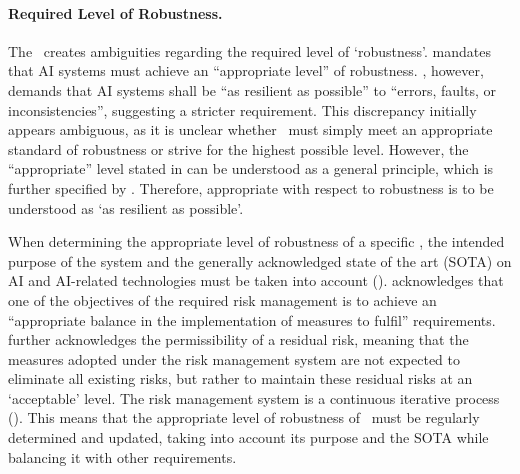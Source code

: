 \paragraph{Required Level of 
Robustness.} 
% 
The \EUAIAct\ creates ambiguities regarding the required level of `robustness'.
%
 mandates that AI systems must achieve an ``appropriate level'' of robustness.
, however, demands that AI systems shall be ``as resilient as possible'' to ``errors, faults, or inconsistencies'', suggesting a stricter requirement. 
% 
This discrepancy initially appears ambiguous, as it is unclear whether \HRAIS\ must simply meet an appropriate standard of robustness or strive for the highest possible level. 
% 
However, the ``appropriate'' level stated in  can be understood as a general principle, which is further specified by . Therefore, appropriate with respect to robustness is to be understood as `as resilient as possible'. 


When determining the appropriate level of robustness of a specific \HRAIS, the intended purpose of the system and the generally acknowledged state of the art (SOTA) on AI and AI-related technologies must be taken into account ().
%
 acknowledges that one of the objectives of the required risk management is to achieve an ``appropriate balance in the implementation of measures to fulfil'' requirements. 
 further acknowledges the permissibility of a residual risk, meaning that the measures adopted under the risk management system are not expected to eliminate all existing risks, but rather to maintain these residual risks at an `acceptable' level.
%
The risk management system is a continuous iterative process ().
% 
This means that the appropriate level of robustness of \HRAIS\ must be regularly determined and updated, taking into account its purpose and the SOTA while balancing it with other requirements.


